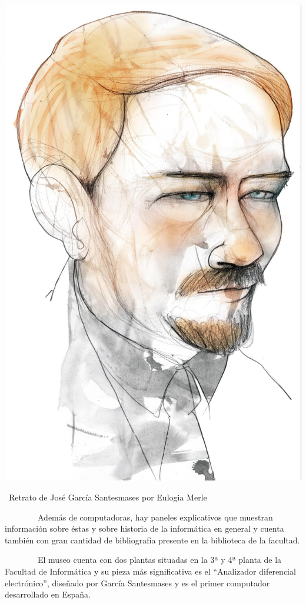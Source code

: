 \documentclass[]{article}
\begin{document}
\includegraphics{images/image03.jpg}

~Retrato de José García Santesmases por Eulogia Merle

~~~~~~~~Además de computadoras, hay paneles explicativos que muestran
información sobre éstas y sobre historia de la informática en general y
cuenta también con gran cantidad de bibliografía presente en la
biblioteca de la facultad.

~~~~~~~~El museo cuenta con dos plantas situadas en la 3ª y 4ª planta de
la Facultad de Informática y su pieza más significativa es el
``Analizador diferencial electrónico'', diseñado por García Santesmases
y es el primer computador desarrollado en España.
\end{document}
